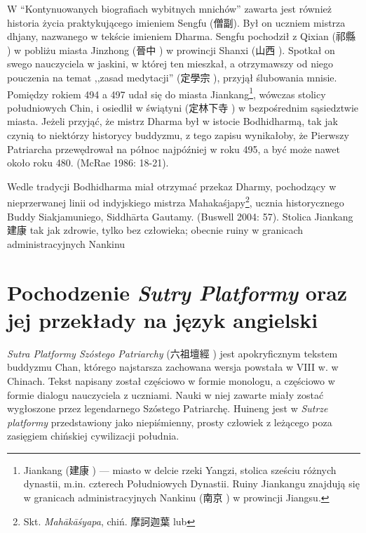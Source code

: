 W ``Kontynuowanych biografiach wybitnych mnichów'' zawarta jest również historia życia praktykującego imieniem Sengfu (僧副).
Był on uczniem mistrza dhjany, nazwanego w tekście imieniem Dharma. Sengfu pochodził z Qixian (祁縣 ) w pobliżu miasta Jinzhong (晉中 ) w prowincji Shanxi (山西 ).
Spotkał on swego nauczyciela w jaskini, w której ten mieszkał, a otrzymawszy od niego pouczenia na temat ,,zasad medytacji'' (定學宗 ), przyjął ślubowania mnisie. Pomiędzy rokiem 494 a 497 udał się do miasta Jiankang\footnote{Jiankang (建康 ) --- miasto w delcie rzeki Yangzi, stolica sześciu różnych dynastii, m.in. czterech Południowych Dynastii. Ruiny Jiankangu znajdują się w granicach administracyjnych Nankinu (南京 ) w prowincji Jiangsu.}, wówczas stolicy południowych Chin, i osiedlił w świątyni (定林下寺 ) w bezpośrednim sąsiedztwie miasta.
Jeżeli przyjąć, że mistrz Dharma był w istocie Bodhidharmą, tak jak czynią to niektórzy historycy buddyzmu, z tego zapisu wynikałoby, że Pierwszy Patriarcha przewędrował na północ najpóźniej w roku 495, a być może nawet około roku 480.
(McRae 1986: 18-21).

Wedle tradycji Bodhidharma miał otrzymać przekaz Dharmy, pochodzący w nieprzerwanej linii od indyjskiego mistrza Mahakaśjapy\footnote{Skt. \textit{Mahākāśyapa}, chiń. 摩訶迦葉  lub }, ucznia historycznego Buddy Siakjamuniego, Siddhārta Gautamy.
(Buswell 2004: 57).
Stolica Jiankang 建康 tak jak zdrowie, tylko bez człowieka; obecnie ruiny w granicach administracyjnych Nankinu
\fi %

\section{Pochodzenie \textit{Sutry Platformy} oraz jej przekłady na język angielski}
\textit{Sutra Platformy Szóstego Patriarchy} (六祖壇經 ) jest apokryficznym tekstem buddyzmu Chan, którego najstarsza zachowana wersja powstała w VIII w. w Chinach. Tekst napisany został częściowo w formie monologu, a częściowo w formie dialogu nauczyciela z uczniami. Nauki w niej zawarte miały zostać wygłoszone przez legendarnego Szóstego Patriarchę.
Huineng jest w \textit{Sutrze platformy} przedstawiony jako niepiśmienny, prosty człowiek z leżącego poza zasięgiem chińskiej cywilizacji południa.

